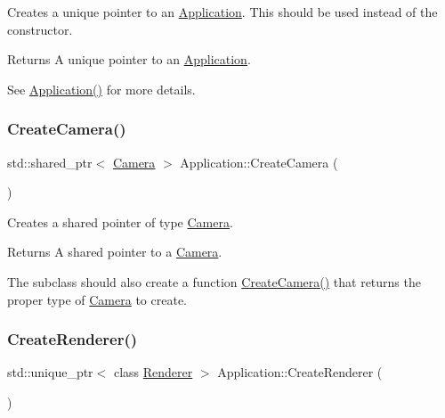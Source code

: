 Creates a unique pointer to an \hyperlink{class_application}{Application}. This should be used instead of the constructor. 

\begin{DoxyReturn}{Returns}
A unique pointer to an \hyperlink{class_application}{Application}.
\end{DoxyReturn}
See \hyperlink{class_application_a78cdcb03e6f06272f7c528fe407951c5}{Application()} for more details. \hypertarget{class_application_a53c0a539fd2c4fe2cc48143cc0a3ea24}{}\label{class_application_a53c0a539fd2c4fe2cc48143cc0a3ea24} 
\subsubsection{\texorpdfstring{Create\+Camera()}{CreateCamera()}}
{\footnotesize\ttfamily std\+::shared\+\_\+ptr$<$ \hyperlink{class_camera}{Camera} $>$ Application\+::\+Create\+Camera (\begin{DoxyParamCaption}{ }\end{DoxyParamCaption})\hspace{0.3cm}{\ttfamily [static]}}



Creates a shared pointer of type \hyperlink{class_camera}{Camera}. 

\begin{DoxyReturn}{Returns}
A shared pointer to a \hyperlink{class_camera}{Camera}.
\end{DoxyReturn}
The subclass should also create a function \hyperlink{class_application_a53c0a539fd2c4fe2cc48143cc0a3ea24}{Create\+Camera()} that returns the proper type of \hyperlink{class_camera}{Camera} to create. \hypertarget{class_application_a90c7fd9ecb6c8923948078903d442919}{}\label{class_application_a90c7fd9ecb6c8923948078903d442919} 
\subsubsection{\texorpdfstring{Create\+Renderer()}{CreateRenderer()}}
{\footnotesize\ttfamily std\+::unique\+\_\+ptr$<$ class \hyperlink{class_renderer}{Renderer} $>$ Application\+::\+Create\+Renderer (\begin{DoxyParamCaption}{ }\end{DoxyParamCaption})\hspace{0.3cm}{\ttfamily [virtual]}}



